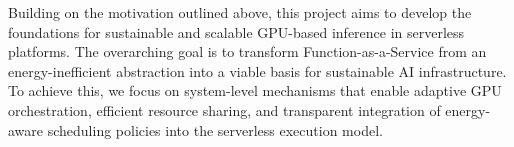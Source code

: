 %
%


Building on the motivation outlined above, this project aims to develop the foundations for sustainable and scalable GPU-based inference in serverless platforms. The overarching goal is to transform Function-as-a-Service from an energy-inefficient abstraction into a viable basis for sustainable AI infrastructure. To achieve this, we focus on system-level mechanisms that enable adaptive GPU orchestration, efficient resource sharing, and transparent integration of energy-aware scheduling policies into the serverless execution model.

